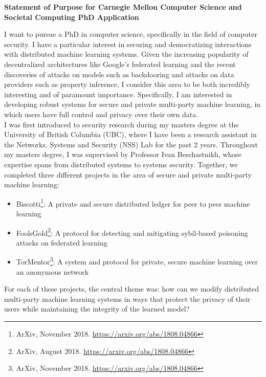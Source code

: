 \documentclass[10pt]{article} %
\begin{document}
\begin{center}
{\large \bf Statement of Purpose for Carnegie Mellon Computer Science and Societal Computing PhD Application}
\end{center}

I want to pursue a PhD in computer science, specifically in the field of computer security. I have a particular interest in securing and democratizing interactions with distributed machine learning systems. Given the increasing popularity of decentralized architectures like Google’s federated learning and the recent discoveries of attacks on models such as backdooring and attacks on data providers such as property inference, I consider this area to be both incredibly interesting and of paramount importance. Specifically, I am interested in developing robust systems for secure and private multi-party machine learning, in which users have full control and privacy over their own data. \\

I was first introduced to security research during my masters degree at the University of British Columbia (UBC), where I have been a research assistant in the Networks, Systems and Security (NSS) Lab for the past 2 years. Throughout my masters degree, I was supervised by Professor Ivan Beschastnikh, whose expertise spans from distributed systems to systems security. Together, we completed three different projects in the area of secure and private multi-party machine learning:
\begin{itemize}
\item Biscotti\footnote{ArXiv, November 2018. \url{https://arxiv.org/abs/1808.04866}}: A private and secure distributed ledger for peer to peer machine learning
\item FoolsGold\footnote{ArXiv, August 2018. \url{https://arxiv.org/abs/1808.04866}}: A protocol for detecting and mitigating sybil-based poisoning attacks on federated learning
\item TorMentor\footnote{ArXiv, November 2018. \url{https://arxiv.org/abs/1808.04866}}: A system and protocol for private, secure machine learning over an anonymous network
\end{itemize}

For each of these projects, the central theme was: how can we modify distributed multi-party machine learning systems in ways that protect the privacy of their users while maintaining the integrity of the learned model? \\
\end{document}
